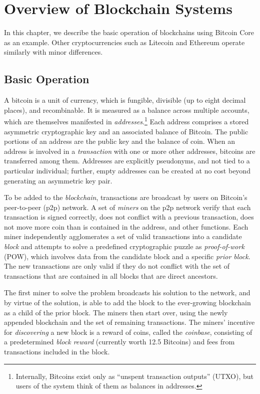 \chapter{Overview of Blockchain Systems}

In this chapter, we describe the basic operation of blockchains using Bitcoin Core as an example. Other cryptocurrencies such as Litecoin and Ethereum operate similarly with minor differences.

\section{Basic Operation}

 A bitcoin is a unit of currency, which is
fungible, divisible (up to eight decimal places), and recombinable.
It is measured as a balance across multiple accounts, which are
themselves manifested in \emph{addresses}.$\!$\footnote{Internally,
  Bitcoins exist only as ``unspent transaction outputs'' (UTXO), but
  users of the system think of them as balances in addresses. } Each address
comprises a stored asymmetric cryptographic key and an associated
balance of Bitcoin. The public portions of an address are the public
key and the balance of coin. When an address is involved in a
\emph{transaction} with one or more other addresses, bitcoins are
transferred among them. Addresses are explicitly pseudonyms, and not tied to a particular 
individual; further, empty addresses can be created at no cost beyond
 generating an asymmetric key pair.

 To be added to the {\em blockchain},
transactions are broadcast by users on Bitcoin's peer-to-peer (p2p) network. A set of
\emph{miners} on the p2p network verify that each transaction is
signed correctly, does not conflict with a previous transaction, does not
move more coin than is contained in the address, and other functions.
Each miner independently agglomerates a set of valid transactions into
a candidate \emph{block} and attempts to solve a predefined
cryptographic puzzle as {\em proof-of-work} (POW), which involves data
from the candidate block and a specific {\em prior block}. The
new transactions  are only valid if they do not
conflict with the set of transactions that are contained in all
blocks that are direct ancestors.

The first miner to solve the problem broadcasts his solution to the
network, and by virtue of the solution, is able to add the block to
the ever-growing blockchain as a child of the prior block. The miners
then start over, using the newly appended blockchain and the set of
remaining transactions. The miners' incentive for {\em discovering}
a new block is a reward of coins, called the {\em coinbase},
consisting of a predetermined {\em block reward} (currently worth 12.5 Bitcoins)
and fees from transactions included in the block.


